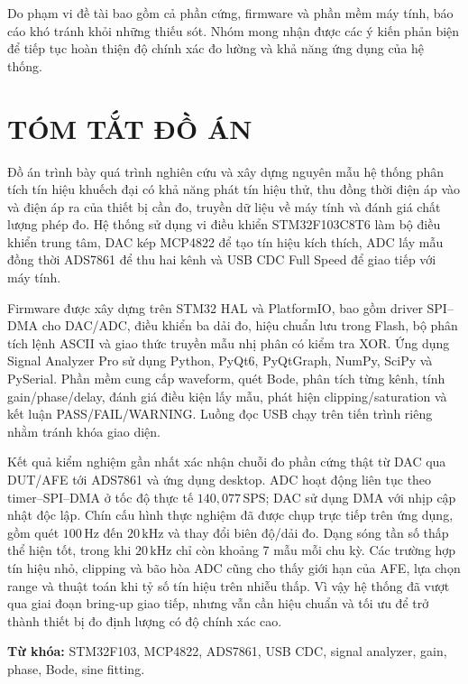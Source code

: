 \documentclass[12pt,a4paper]{report}
\newcommand{\unit}[1]{\,\mathrm{#1}}
\begin{document}
Do phạm vi đề tài bao gồm cả phần cứng, firmware và phần mềm máy tính, báo cáo khó tránh khỏi những thiếu sót. Nhóm mong nhận được các ý kiến phản biện để tiếp tục hoàn thiện độ chính xác đo lường và khả năng ứng dụng của hệ thống.
\clearpage

\chapter*{TÓM TẮT ĐỒ ÁN}
Đồ án trình bày quá trình nghiên cứu và xây dựng nguyên mẫu hệ thống phân tích tín hiệu khuếch đại có khả năng phát tín hiệu thử, thu đồng thời điện áp vào và điện áp ra của thiết bị cần đo, truyền dữ liệu về máy tính và đánh giá chất lượng phép đo. Hệ thống sử dụng vi điều khiển STM32F103C8T6 làm bộ điều khiển trung tâm, DAC kép MCP4822 để tạo tín hiệu kích thích, ADC lấy mẫu đồng thời ADS7861 để thu hai kênh và USB CDC Full Speed để giao tiếp với máy tính.

Firmware được xây dựng trên STM32 HAL và PlatformIO, bao gồm driver SPI--DMA cho DAC/ADC, điều khiển ba dải đo, hiệu chuẩn lưu trong Flash, bộ phân tích lệnh ASCII và giao thức truyền mẫu nhị phân có kiểm tra XOR. Ứng dụng Signal Analyzer Pro sử dụng Python, PyQt6, PyQtGraph, NumPy, SciPy và PySerial. Phần mềm cung cấp waveform, quét Bode, phân tích từng kênh, tính gain/phase/delay, đánh giá điều kiện lấy mẫu, phát hiện clipping/saturation và kết luận PASS/FAIL/WARNING. Luồng đọc USB chạy trên tiến trình riêng nhằm tránh khóa giao diện.

Kết quả kiểm nghiệm gần nhất xác nhận chuỗi đo phần cứng thật từ DAC qua DUT/AFE tới ADS7861 và ứng dụng desktop. ADC hoạt động liên tục theo timer--SPI--DMA ở tốc độ thực tế $140{,}077\unit{SPS}$; DAC sử dụng DMA với nhịp cập nhật độc lập. Chín cấu hình thực nghiệm đã được chụp trực tiếp trên ứng dụng, gồm quét $100\unit{Hz}$ đến $20\unit{kHz}$ và thay đổi biên độ/dải đo. Dạng sóng tần số thấp thể hiện tốt, trong khi $20\unit{kHz}$ chỉ còn khoảng 7 mẫu mỗi chu kỳ. Các trường hợp tín hiệu nhỏ, clipping và bão hòa ADC cũng cho thấy giới hạn của AFE, lựa chọn range và thuật toán khi tỷ số tín hiệu trên nhiễu thấp. Vì vậy hệ thống đã vượt qua giai đoạn bring-up giao tiếp, nhưng vẫn cần hiệu chuẩn và tối ưu để trở thành thiết bị đo định lượng có độ chính xác cao.

\textbf{Từ khóa:} STM32F103, MCP4822, ADS7861, USB CDC, signal analyzer, gain, phase, Bode, sine fitting.
\clearpage

\tableofcontents
\clearpage
\listoffigures
\clearpage
\listoftables
\clearpage
\end{document}
